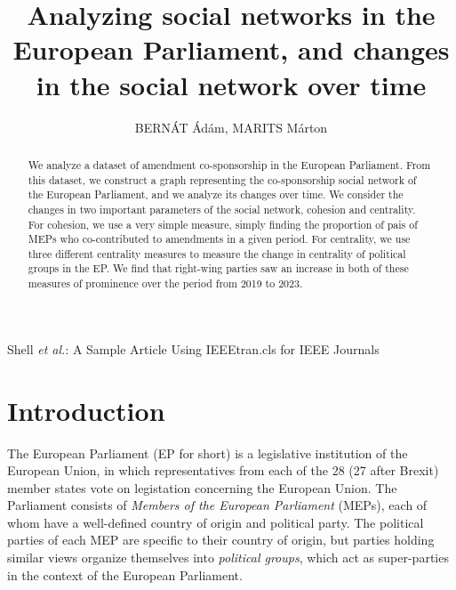 \documentclass[lettersize,journal]{IEEEtran}
\begin{document}
\title{Analyzing social networks in the European Parliament, and changes in the social network over time}

\author{{BERNÁT Ádám, MARITS Márton}
}

%
{Shell \MakeLowercase{\textit{et al.}}: A Sample Article Using IEEEtran.cls for IEEE Journals}


\maketitle

\begin{abstract}
	We analyze a dataset of amendment co-sponsorship in the European Parliament. From this dataset, we construct a graph representing the co-sponsorship social network of the European Parliament, and we analyze its changes over time. We consider the changes in two important parameters of the social network, cohesion and centrality. For cohesion, we use a very simple measure, simply finding the proportion of pais of MEPs who co-contributed to amendments in a given period. For centrality, we use three different centrality measures to measure the change in centrality of political groups in the EP. We find that right-wing parties saw an increase in both of these measures of prominence over the period from 2019 to 2023.
\end{abstract}

\section{Introduction} \label{sec:intro}

The European Parliament (EP for short) is a legislative institution of the European Union, in which representatives from each of the 28 (27 after Brexit) member states vote on legistation concerning the European Union. The Parliament consists of \textit{Members of the European Parliament} (MEPs), each of whom have a well-defined country of origin and political party. The political parties of each MEP are specific to their country of origin, but parties holding similar views organize themselves into \textit{political groups}, which act as super-parties in the context of the European Parliament.
\end{document}

